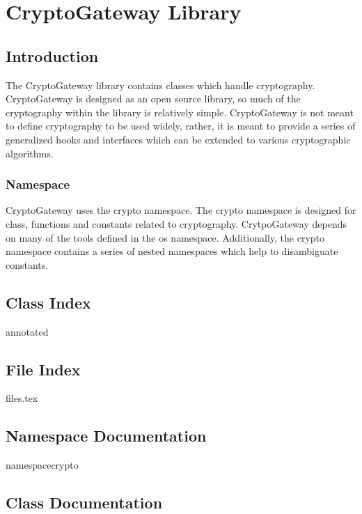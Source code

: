 \part{CryptoGateway Library} \label{sec:cryptogateway}

	\chapter{Introduction}

	The CryptoGateway library contains classes which handle cryptography.  CryptoGateway is designed as an open source library, so much of the cryptography within the library is relatively simple.  CryptoGateway is not meant to define cryptography to be used widely, rather, it is meant to provide a series of generalized hooks and interfaces which can be extended to various cryptographic algorithms.
		
		\section{Namespace} \label{sec:Namespace}
		CryptoGateway uses the crypto namespace.  The crypto namespace is designed for class, functions and constants related to cryptography.  CrytpoGateway depends on many of the tools defined in the os namespace.  Additionally, the crypto namespace contains a series of nested namespaces which help to disambiguate constants.

	\renewcommand{\DOXYGENFOLDER}{../../CryptoGateway/Documentation/doxygenFiles/latex/}
	
	\chapter{Class Index}
		{annotated}
	\chapter{File Index}
		{files.tex}
	\chapter{Namespace Documentation}
		{namespacecrypto}
	
	\chapter{Class Documentation}
	
